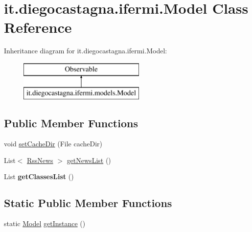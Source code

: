 \hypertarget{classit_1_1diegocastagna_1_1ifermi_1_1_model}{}\section{it.\+diegocastagna.\+ifermi.\+Model Class Reference}
\label{classit_1_1diegocastagna_1_1ifermi_1_1_model}
Inheritance diagram for it.\+diegocastagna.\+ifermi.\+Model\+:\begin{figure}[H]
\begin{center}
\leavevmode
\includegraphics[height=2.000000cm]{classit_1_1diegocastagna_1_1ifermi_1_1_model}
\end{center}
\end{figure}
\subsection*{Public Member Functions}
\begin{DoxyCompactItemize}
\item 
void \mbox{\hyperlink{classit_1_1diegocastagna_1_1ifermi_1_1_model_a20afec0ef2cafa446628b2d7e852b34c}{set\+Cache\+Dir}} (File cache\+Dir)
\item 
List$<$ \mbox{\hyperlink{classit_1_1diegocastagna_1_1ifermi_1_1_rss_news}{Rss\+News}} $>$ \mbox{\hyperlink{classit_1_1diegocastagna_1_1ifermi_1_1_model_a41538c6de4e4fd7fe8a8eb668dffba1b}{get\+News\+List}} ()
\item 
\mbox{\label{classit_1_1diegocastagna_1_1ifermi_1_1_model_ad5f31e675e557ad8990ffc3c13ec462d}} 
List {\bfseries get\+Classes\+List} ()
\end{DoxyCompactItemize}
\subsection*{Static Public Member Functions}
\begin{DoxyCompactItemize}
\item 
static \mbox{\hyperlink{classit_1_1diegocastagna_1_1ifermi_1_1_model}{Model}} \mbox{\hyperlink{classit_1_1diegocastagna_1_1ifermi_1_1_model_a282c5d95b08eb1f112fd52e0030bfa43}{get\+Instance}} ()
\end{DoxyCompactItemize}
